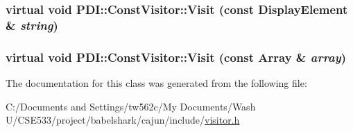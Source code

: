 \hypertarget{class_p_d_i_1_1_const_visitor_524441ec45975a709fede105f8c30361}{
\subsubsection[{Visit}]{\setlength{\rightskip}{0pt plus 5cm}virtual void PDI::ConstVisitor::Visit (const {\bf DisplayElement} \& {\em string})}}
\label{class_p_d_i_1_1_const_visitor_524441ec45975a709fede105f8c30361}


\hypertarget{class_p_d_i_1_1_const_visitor_7a7cf2134195f958a2d5eeeb6cfc2561}{
\subsubsection[{Visit}]{\setlength{\rightskip}{0pt plus 5cm}virtual void PDI::ConstVisitor::Visit (const {\bf Array} \& {\em array})}}
\label{class_p_d_i_1_1_const_visitor_7a7cf2134195f958a2d5eeeb6cfc2561}




The documentation for this class was generated from the following file:\begin{CompactItemize}
\item 
C:/Documents and Settings/tw562c/My Documents/Wash U/CSE533/project/babelshark/cajun/include/\hyperlink{visitor_8h}{visitor.h}\end{CompactItemize}
